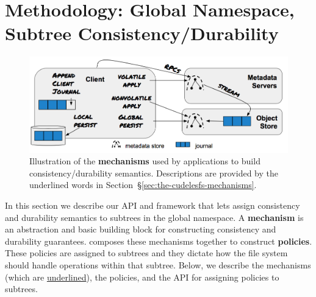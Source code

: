 \section{Methodology: Global Namespace, Subtree Consistency/Durability}
\label{sec:methodology-decoupled-namespaces}

\begin{figure}[tb]
\centering
\includegraphics[width=1.0\linewidth]{figures/fig-decouple.png}
\caption{Illustration of the \textbf{mechanisms} used by applications to build
consistency/durability semantics. Descriptions are provided by the
underlined words in Section~\S\ref{sec:the-cudelesfs-mechanisms}.
}\label{fig:decouple}
\end{figure}


In this section we describe our API and framework that lets
 assign consistency and durability
semantics to subtrees in the global namespace. A \textbf{mechanism} is an
abstraction and basic building block for constructing consistency and
durability guarantees.  composes these mechanisms together to
construct \textbf{policies}.  These policies are assigned to subtrees and they
dictate how the file system should handle operations within that subtree.
Below, we describe the mechanisms (which are \underline{underlined}), the
policies, and the API for assigning policies to subtrees.

